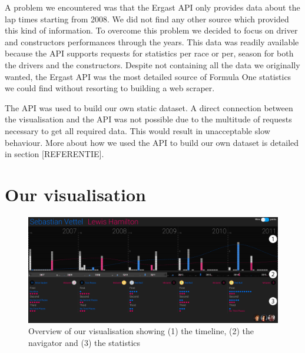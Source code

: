 \documentclass{sigchi}
\begin{document}
A problem we encountered was that the Ergast API only provides data about the lap times starting from 2008. We did not find any other source which provided this kind of information. To overcome this problem we decided to focus on driver and constructors performances through the years. This data was readily available because the API supports requests for statistics per race or per, season for both the drivers and the constructors. Despite not containing all the data we originally wanted, the Ergast API was the most detailed source of Formula One statistics we could find without resorting to building  a web scraper. 

The API was used to build our own static dataset. A direct connection between the visualisation and the API was not possible due to the multitude of requests necessary to get all required data. This would result in unacceptable slow behaviour. More about how we used the API to build our own dataset is detailed in section [REFERENTIE]. 


\section{Our visualisation}
\begin{figure}[tp]
  \centering
  \includegraphics[width=1\textwidth]{images/overview.png}
  \caption{Overview of our visualisation showing (1) the timeline, (2) the navigator and (3) the statistics}
  \label{fig:overview}
\end{figure}
\end{document}
